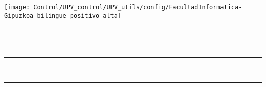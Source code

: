 \thispagestyle{empty}

\newcommand{\HRule}{\rule{\linewidth}{0.5mm}} 

\thispagestyle{empty}
\begin{center}
	
  \texttt{[image: Control/UPV\_control/UPV\_utils/config/FacultadInformatica-Gipuzkoa-bilingue-positivo-alta]} \\[2cm]
  
  {\LARGE \gapizenburua}\\[0.5cm]
  {\Large \ikasketak}\\[0.25cm]
  {\espezialitatea}\\[2cm]
  
  
  \HRule \\[0.5cm]
  {\LARGE 
    \textbf{\izenburua}
  }
  \HRule \\[0.5cm]

  \Large \textsl{\egilea}\\
  
   
  \vfill
  
  \textbf{\zuzendariaktestua}\\
  \zuzendariak\\[2cm]
  
  \data

\end{center}
